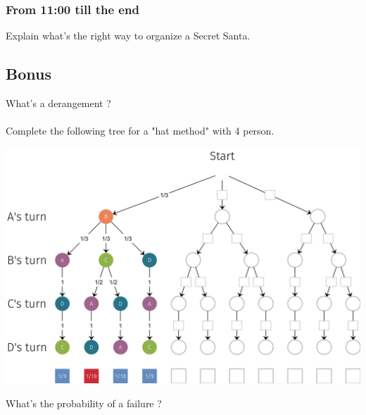 \documentclass[12pt,a4paper,eval,english,firamath]{nsi}
\begin{document}
\subsubsection*{From 11:00 till the end}
Explain what's the right way to organize a Secret Santa.\\

\subsection*{Bonus}

What's a derangement ?\\

\\

Complete the following tree for a "hat method" with 4 person.
\begin{center}
    \includegraphics[width=16.8cm]{img/tree_santa4.png}
\end{center}
What's the probability of a failure ?\\

\end{document}
